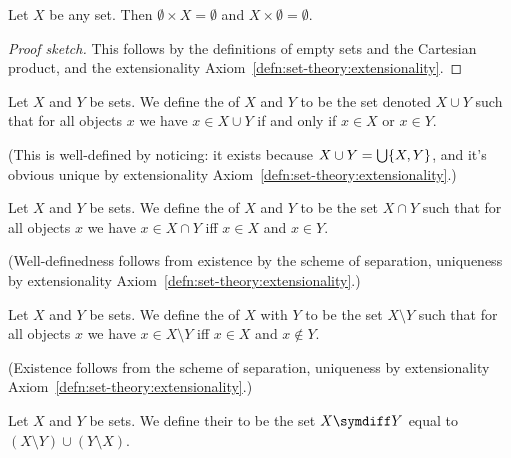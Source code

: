 \begin{theorem}
Let $X$ be any set. Then $\emptyset\times X=\emptyset$ and
$X\times\emptyset=\emptyset$. 
\end{theorem}

\begin{proof}[Proof sketch]
This follows by the definitions of empty sets and the Cartesian
product, and the extensionality Axiom~\ref{defn:set-theory:extensionality}.
\end{proof}

\begin{definition}
Let $X$ and $Y$ be sets. We define the  of $X$ and $Y$
to be the set denoted $X\cup Y$ such that for all objects $x$ we have
$x\in X\cup Y$ if and only if $x\in X$ or $x\in Y$.

(This is well-defined by noticing: it exists because
$X\cup Y=\bigcup\{X,Y\}$, and it's obvious unique by extensionality Axiom~\ref{defn:set-theory:extensionality}.)
\end{definition}

\begin{definition}
Let $X$ and $Y$ be sets. We define the  of $X$
and $Y$ to be the set $X\cap Y$ such that for all objects $x$ we have
$x\in X\cap Y$ iff $x\in X$ and $x\in Y$.

(Well-definedness follows from existence by the scheme of separation,
uniqueness by extensionality Axiom~\ref{defn:set-theory:extensionality}.)
\end{definition}

\begin{definition}
Let $X$ and $Y$ be sets.
We define the  of $X$ with $Y$ to be the set
$X\setminus Y$ such that for all objects $x$ we have $x\in X\setminus Y$
iff $x\in X$ and $x\notin Y$.

(Existence follows from the scheme of separation, uniqueness by
extensionality Axiom~\ref{defn:set-theory:extensionality}.)
\end{definition}

\begin{definition}
Let $X$ and $Y$ be sets. We define their 
to be the set $X\symdiff Y$ equal to $(X\setminus Y)\cup(Y\setminus X)$.
\end{definition}

